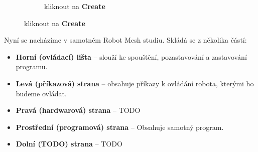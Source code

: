 \documentclass[../main.tex]{subfiles}
\begin{document}
\begin{figure}[ht]
		\begin{subfigure}{.3\textwidth}%
			\centering%
			\caption{kliknout na \textbf{Create}}%
		\end{subfigure}%
	\end{figure}

	\newpage

	Nyní se nacházíme v samotném Robot Mesh studiu. Skládá se z několika částí:

	\begin{itemize}
		\item \textbf{Horní (ovládací) lišta} -- slouží ke spouštění, pozastavování a zastavování programu.
		\item \textbf{Levá (příkazová) strana} -- obsahuje příkazy k ovládání robota, kterými ho budeme ovládat.
		\item \textbf{Pravá (hardwarová) strana} -- TODO
		\item \textbf{Prostřední (programová) strana} -- Obsahuje samotný program.
		\item \textbf{Dolní (TODO) strana} -- TODO
	\end{itemize}

	\begin{figure}[h!]
		\centering
	\end{figure}
\end{document}
